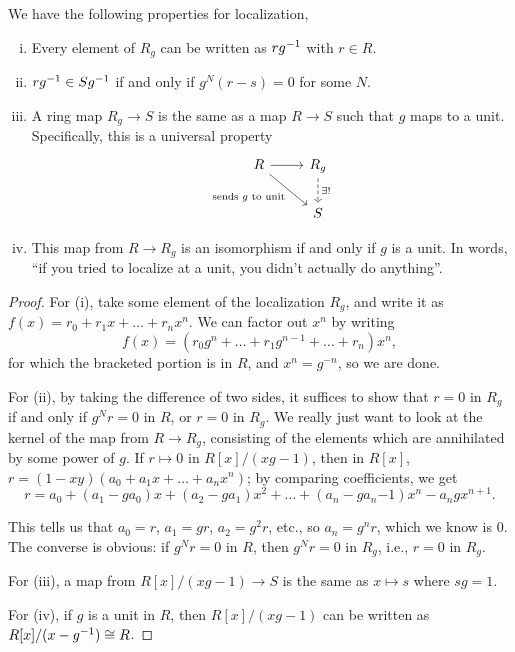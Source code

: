 \begin{theorem} \label{thm:properties_of_localization}
    We have the following properties for localization,
    \begin{enumerate}[(i)]
        \item Every element of $R_g$ can be written as $rg^{-1}$ with $r \in R$. 
        \item $rg^{-1} \in Sg^{-1}$ if and only if $g^N (r - s) = 0$ for some $N$.
        \item A ring map $R_g \to S$ is the same as a map $R \to S$ such that $g$ maps to a unit. Specifically, this is a universal property
        \[ \begin{tikzcd}
            R \arrow[r] \arrow[dr, "\text{sends $g$ to unit}"'] & R_g \arrow[d, dashed, "\exists!"]\\ & S
        \end{tikzcd} \]
        \item This map from $R \to R_g$ is an isomorphism if and only if $g$ is a unit. In words, ``if you tried to localize at a unit, you didn't actually do anything''.
    \end{enumerate}
\end{theorem}
\begin{proof}
    For (i), take some element of the localization $R_g$, and write it as $f(x) = r_0 + r_1x + \dots + r_nx^n$. We can factor out $x^n$ by writing
    \[ f(x) = (r_0 g^n + \dots + r_1 g^{n-1} + \dots + r_n)x^n, \]
    for which the bracketed portion is in $R$, and $x^n = g^{-n}$, so we are done.

    For (ii), by taking the difference of two sides, it suffices to show that $r = 0$ in $R_g$ if and only if $g^N r = 0$ in $R$, or $r = 0$ in $R_g$. We really just want to look at the kernel of the map from $R \to R_g$, consisting of the elements which are annihilated by some power of $g$. If $r \mapsto 0$ in $R[x]/(xg - 1)$, then in $R[x]$, $r = (1 - xy)(a_0 + a_1x + \dots + a_nx^n)$; by comparing coefficients, we get
    \[ r = a_0 + (a_1 - g a_0) x + (a_2 - g a_1) x^2 + \dots + (a_n - g a_n{-1}) x^n - a_n g x^{n+1}. \]

    \newpage
    This tells us that $a_0 = r$, $a_1 = gr$, $a_2 = g^2 r$, etc., so $a_n = g^n r$, which we know is $0$. The converse is obvious: if $g^N r = 0$ in $R$, then $g^N r = 0$ in $R_g$, i.e., $r = 0$ in $R_g$.

    For (iii), a map from $R[x]/(xg - 1) \to S$ is the same as $x \mapsto s$ where $sg = 1$.

    For (iv), if $g$ is a unit in $R$, then $R[x]/(xg - 1)$ can be written as $R[x]/(x - g^{-1}) \cong R$.
\end{proof}

